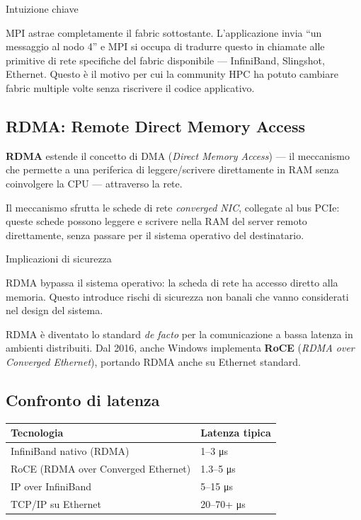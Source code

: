 \documentclass[
  italian,
  openany]{book}
\newcounter{none} %
\begin{document}
\begin{callouttip}{Intuizione chiave}

MPI astrae completamente il fabric sottostante. L'applicazione invia
``un messaggio al nodo 4'' e MPI si occupa di tradurre questo in
chiamate alle primitive di rete specifiche del fabric disponibile ---
InfiniBand, Slingshot, Ethernet. Questo è il motivo per cui la community
HPC ha potuto cambiare fabric multiple volte senza riscrivere il codice
applicativo.

\end{callouttip}

\subsection{RDMA: Remote Direct Memory
Access}\label{rdma-remote-direct-memory-access}

\textbf{RDMA} estende il concetto di DMA (\emph{Direct Memory Access})
--- il meccanismo che permette a una periferica di leggere/scrivere
direttamente in RAM senza coinvolgere la CPU --- attraverso la rete.

Il meccanismo sfrutta le schede di rete \emph{converged NIC}, collegate
al bus PCIe: queste schede possono leggere e scrivere nella RAM del
server remoto direttamente, senza passare per il sistema operativo del
destinatario.

\begin{calloutwarning}{Implicazioni di sicurezza}

RDMA bypassa il sistema operativo: la scheda di rete ha accesso diretto
alla memoria. Questo introduce rischi di sicurezza non banali che vanno
considerati nel design del sistema.

\end{calloutwarning}

RDMA è diventato lo standard \emph{de facto} per la comunicazione a
bassa latenza in ambienti distribuiti. Dal 2016, anche Windows
implementa \textbf{RoCE} (\emph{RDMA over Converged Ethernet}), portando
RDMA anche su Ethernet standard.

\subsection{Confronto di latenza}\label{confronto-di-latenza}

{\def\LTcaptype{none} %
\begin{longtable}[]{@{}ll@{}}
\toprule\noalign{}
Tecnologia & Latenza tipica \\
\midrule\noalign{}
\endhead
\bottomrule\noalign{}
\endlastfoot
InfiniBand nativo (RDMA) & 1--3 μs \\
RoCE (RDMA over Converged Ethernet) & 1.3--5 μs \\
IP over InfiniBand & 5--15 μs \\
TCP/IP su Ethernet & 20--70+ μs \\
\end{longtable}
}
\end{document}
